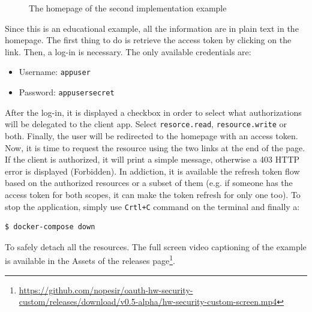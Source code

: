 \begin{figure}[h!]
    \centering
    \caption{The homepage of the second implementation example}
    \label{fig:home2}
\end{figure}

\noindent Since this is an educational example, all the information are in plain text in the homepage. The first thing to do is retrieve the access token by clicking on the link. Then, a log-in is necessary. The only available credentials are:

\begin{itemize}
    \item Username: \texttt{appuser}
    \item Password: \texttt{appusersecret}
\end{itemize}


\noindent After the log-in, it is displayed a checkbox in order to select what authorizations will be delegated to the client app. Select \texttt{resorce.read}, \texttt{resource.write} or both. 
Finally, the user will be redirected to the homepage with an access token. Now, it is time to request the resource using the two links at the end of the page. If the client is authorized, it will print a simple message, otherwise a 403 HTTP error is displayed (Forbidden). In addiction, it is available the refresh token flow based on the authorized resources or a subset of them (e.g. if someone has the access token for both scopes, it can make the token refresh for only one too). To stop the application, simply use \texttt{Crtl+C} command on the terminal and finally a:
\begin{lstlisting}[language=bash]
  $ docker-compose down
\end{lstlisting}



\noindent To safely detach all the resources.
The full screen video captioning of the example is available in the Assets of the releases page\footnote{\scriptsize{\url{https://github.com/nopesir/oauth-hw-security-custom/releases/download/v0.5-alpha/hw-security-custom-screen.mp4}}}. 
